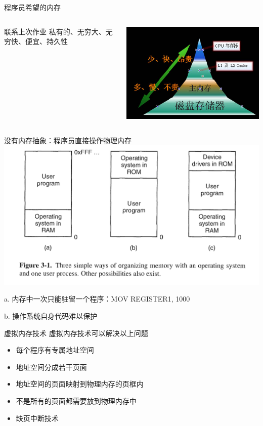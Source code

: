 \documentclass[xcolor=svgnames]{beamer}
\begin{document}
\begin{CJK*}{UTF8}{gbsn}
\begin{frame}{程序员希望的内存}
\begin{columns}%
\begin{block}{联系上次作业}
私有的、无穷大、无穷快、便宜、持久性
\end{block}
\includegraphics[width=1.0\textwidth]{memory_hier.jpg}
\end{columns}%
\end{frame}

\begin{frame}{没有内存抽象：程序员直接操作物理内存}
\includegraphics[width=1.0\textwidth]{nomem.png}

a. 内存中一次只能驻留一个程序：\alert{MOV REGISTER1, 1000}

b. 操作系统自身代码难以保护
\end{frame}

\begin{frame}{虚拟内存技术}
虚拟内存技术可以解决以上问题
\begin{itemize}
\item 每个程序有专属地址空间
\item 地址空间分成若干页面
\item 地址空间的页面映射到物理内存的页框内
\item 不是所有的页面都需要放到物理内存中
\item 缺页中断技术
\end{itemize}
\end{frame}


\end{CJK*}
\end{document}
